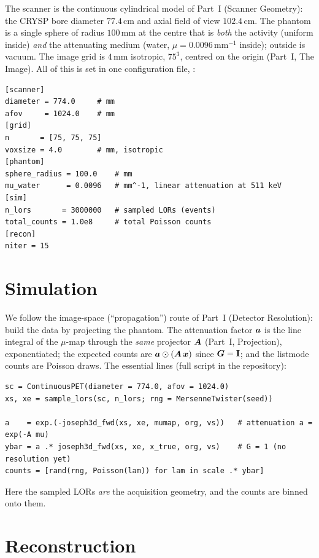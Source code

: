 \documentclass[11pt,a4paper]{article}
\begin{document}
The scanner is the continuous cylindrical model of Part~I (Scanner Geometry):
the CRYSP bore diameter $77.4\,\mathrm{cm}$ and axial field of view
$102.4\,\mathrm{cm}$. The phantom is a single sphere of radius
$100\,\mathrm{mm}$ at the centre that is \emph{both} the activity (uniform
inside) \emph{and} the attenuating medium (water, $\mu=0.0096\,\mathrm{mm}^{-1}$
inside); outside is vacuum. The image grid is $4\,\mathrm{mm}$ isotropic,
$75^3$, centred on the origin (Part~I, The Image). All of this is set in one
configuration file, :
\begin{lstlisting}
[scanner]
diameter = 774.0     # mm
afov     = 1024.0    # mm
[grid]
n       = [75, 75, 75]
voxsize = 4.0        # mm, isotropic
[phantom]
sphere_radius = 100.0    # mm
mu_water      = 0.0096   # mm^-1, linear attenuation at 511 keV
[sim]
n_lors       = 3000000   # sampled LORs (events)
total_counts = 1.0e8     # total Poisson counts
[recon]
niter = 15
\end{lstlisting}

\section{Simulation}
\label{sec:ex-att:sim}

We follow the image-space (``propagation'') route of Part~I (Detector
Resolution): build the data by projecting the phantom. The attenuation factor
$\bm{a}$ is the line integral of the $\mu$-map through the \emph{same} projector
$\bm{A}$ (Part~I, Projection), exponentiated; the expected counts are
$\bm{a}\odot(\bm{A}\,\bm{x})$ since $\bm{G}=\mathbf I$; and the listmode counts are
Poisson draws. The essential lines (full script in the repository):
\begin{lstlisting}
sc = ContinuousPET(diameter = 774.0, afov = 1024.0)
xs, xe = sample_lors(sc, n_lors; rng = MersenneTwister(seed))

a    = exp.(-joseph3d_fwd(xs, xe, mumap, org, vs))   # attenuation a = exp(-A mu)
ybar = a .* joseph3d_fwd(xs, xe, x_true, org, vs)    # G = 1 (no resolution yet)
counts = [rand(rng, Poisson(lam)) for lam in scale .* ybar]
\end{lstlisting}
Here the sampled LORs \emph{are} the acquisition geometry, and the counts are
binned onto them.

\section{Reconstruction}
\label{sec:ex-att:recon}
\end{document}
